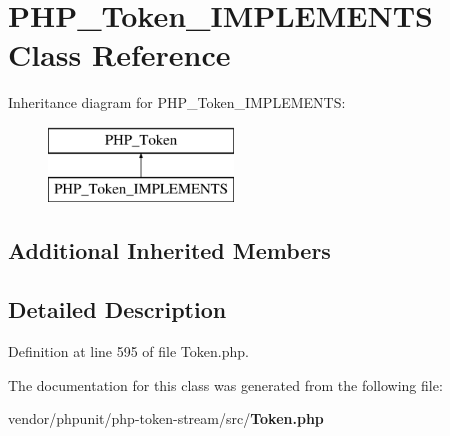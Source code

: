 \section{P\+H\+P\+\_\+\+Token\+\_\+\+I\+M\+P\+L\+E\+M\+E\+N\+T\+S Class Reference}
\label{class_p_h_p___token___i_m_p_l_e_m_e_n_t_s}
Inheritance diagram for P\+H\+P\+\_\+\+Token\+\_\+\+I\+M\+P\+L\+E\+M\+E\+N\+T\+S\+:\begin{figure}[H]
\begin{center}
\leavevmode
\includegraphics[height=2.000000cm]{class_p_h_p___token___i_m_p_l_e_m_e_n_t_s}
\end{center}
\end{figure}
\subsection*{Additional Inherited Members}


\subsection{Detailed Description}


Definition at line 595 of file Token.\+php.



The documentation for this class was generated from the following file\+:\begin{DoxyCompactItemize}
\item 
vendor/phpunit/php-\/token-\/stream/src/{\bf Token.\+php}\end{DoxyCompactItemize}
